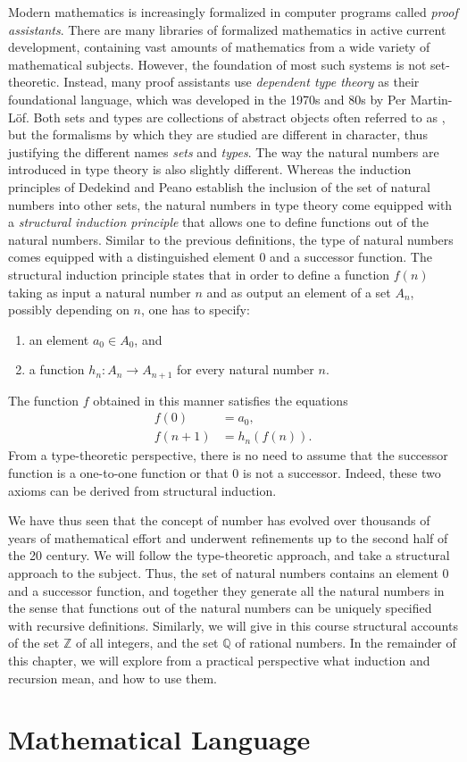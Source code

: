 Modern mathematics is increasingly formalized in computer programs called \emph{proof assistants}. There are many libraries of formalized mathematics in active current development, containing vast amounts of mathematics from a wide variety of mathematical subjects. However, the foundation of most such systems is not set-theoretic. Instead, many proof assistants use \emph{dependent type theory} as their foundational language, which was developed in the 1970s and 80s by Per Martin-L\"of. Both sets and types are collections of abstract objects often referred to as , but the formalisms by which they are studied are different in character, thus justifying the different names \emph{sets} and \emph{types}. The way the natural numbers are introduced in type theory is also slightly different. Whereas the induction principles of Dedekind and Peano establish the inclusion of the set of natural numbers into other sets, the natural numbers in type theory come equipped with a \emph{structural induction principle} that allows one to define functions out of the natural numbers. Similar to the previous definitions, the type of natural numbers comes equipped with a distinguished element $0$ and a successor function. The structural induction principle states that in order to define a function $f(n)$ taking as input a natural number $n$ and as output an element of a set $A_n$, possibly depending on $n$, one has to specify:
\begin{enumerate}
\item an element $a_0\in A_0$, and
\item a function $h_n: A_n\to A_{n+1}$ for every natural number $n$.
\end{enumerate}
The function $f$ obtained in this manner satisfies the equations
\begin{align*}
  f(0) & = a_0, \\
  f(n+1) & = h_n(f(n)).
\end{align*}
From a type-theoretic perspective, there is no need to assume that the successor function is a one-to-one function or that $0$ is not a successor. Indeed, these two axioms can be derived from structural induction.

We have thus seen that the concept of number has evolved over thousands of years of mathematical effort and underwent refinements up to the second half of the 20\supth{} century. We will follow the type-theoretic approach, and take a structural approach to the subject. Thus, the set of natural numbers contains an element $0$ and a successor function, and together they generate all the natural numbers in the sense that functions out of the natural numbers can be uniquely specified with recursive definitions. Similarly, we will give in this course structural accounts of the set $\mathbb{Z}$ of all integers, and the set $\mathbb{Q}$ of rational numbers. In the remainder of this chapter, we will explore from a practical perspective what induction and recursion mean, and how to use them.

\section{Mathematical Language}


